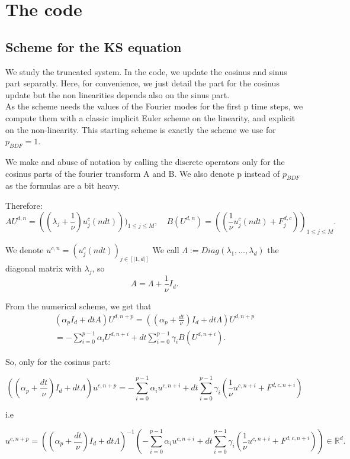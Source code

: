 \documentclass[12pt]{article}
\begin{document}
\newpage
\appendix
\section{The code}
\subsection{Scheme for the KS equation}\label{KS_computation_numerics}

We study the truncated system. In the code, we update the cosinus and sinus part separatly. Here, for convenience, we just detail the part for the cosinus update but the non linearities depends also on the sinus part.
\\
As the scheme needs the values of the Fourier modes for the first p time steps, we compute them with a classic implicit Euler scheme on the linearity, and explicit on the non-linearity. This starting scheme is exactly the scheme we use for $p_{BDF}=1.$

We make and abuse of notation by calling the discrete operators only for the cosinus parts of the fourier transform A and B. We also denote p instead of $p_{BDF}$ as the formulas are a bit heavy.

Therefore: 
$$AU^{d,n} = ((\lambda_j + \frac{1}{\nu})u_j^c(ndt)))_{1\leq j \leq M}, \quad B(U^{d,n}) = ((\frac{1}{\nu}u_j^c(ndt) + F_j^{d,c}))_{1\leq j \leq M}.$$


We denote $u^{c,n} =(u_j^c(ndt))_{j\in [|1,d|]}$
We call $\Lambda:= Diag(\lambda_1,\dots,\lambda_d)$ the diagonal matrix with $\lambda_j$,  so $$A = \Lambda + \frac{1}{\nu}I_d.$$
  
From the numerical scheme, we get that 
\begin{align*}
  (\alpha_p I_d + dtA)U^{d,n+p} = ((\alpha_p+\frac{dt}{\nu}) I_d + dt\Lambda)U^{d,n+p}\\
  = -\sum_{i=0}^{p-1}\alpha_iU^{d,n+i} + dt\sum_{i=0}^{p-1}\gamma_i B(U^{d,n+i}).
\end{align*}

So, only for the cosinus part:  
  
$$((\alpha_p+\frac{dt}{\nu}) I_d + dt\Lambda)u^{c,n+p}= -\sum_{i=0}^{p-1}\alpha_iu^{c,n+i} + dt\sum_{i=0}^{p-1}\gamma_i (\frac{1}{\nu} u^{c, n+i} + F^{d, c, n+i})$$

i.e 

$$u^{c, n+p}= ((\alpha_p+\frac{dt}{\nu}) I_d + dt\Lambda)^{-1}(-\sum_{i=0}^{p-1}\alpha_iu^{c, n+i} + dt\sum_{i=0}^{p-1}\gamma_i (\frac{1}{\nu} u^{c, n+i} + F^{d,c, n+i})) \in \mathbb{R}^d.$$
\end{document}
